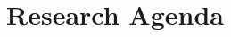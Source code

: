 \documentclass[conference]{IEEEtran}
\begin{document}






\section{Research Agenda}
\label{sec:results:topIssues}
\end{document}
